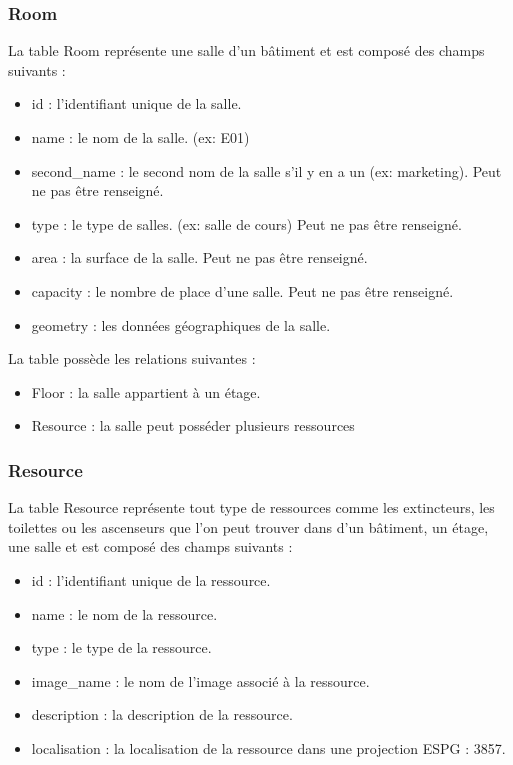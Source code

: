 \documentclass[
    iai, %
    il, %
]{heig-tb}
\begin{document}
\subsubsection{Room}
La table Room représente une salle d'un bâtiment et est composé des champs suivants :

\begin{itemize}
    \item id : l'identifiant unique de la salle.
    \item name : le nom de la salle. (ex: E01)
    \item second\_name : le second nom de la salle s'il y en a un (ex: marketing). Peut ne pas être renseigné.
    \item type : le type de salles. (ex: salle de cours) Peut ne pas être renseigné.
    \item area : la surface de la salle. Peut ne pas être renseigné.
    \item capacity : le nombre de place d'une salle. Peut ne pas être renseigné.
    \item geometry : les données géographiques de la salle.
\end{itemize}

La table possède les relations suivantes :
\begin{itemize}
    \item Floor : la salle appartient à un étage.
    \item Resource : la salle peut posséder plusieurs ressources
\end{itemize}

\subsubsection{Resource}
La table Resource représente tout type de ressources comme les extincteurs, les toilettes ou les ascenseurs
que l'on peut trouver dans d'un bâtiment, un étage, une salle et est composé des champs suivants :

\begin{itemize}
    \item id : l'identifiant unique de la ressource.
    \item name : le nom de la ressource.
    \item type : le type de la ressource.
    \item image\_name : le nom de l'image associé à la ressource.
    \item description : la description de la ressource.
    \item localisation : la localisation de la ressource dans une projection ESPG : 3857.
\end{itemize}
\end{document}
